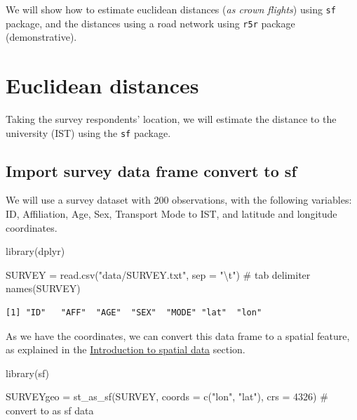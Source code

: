 \documentclass[
  letterpaper,
  DIV=11,
  numbers=noendperiod]{scrreprt}
\newenvironment{Shaded}{\begin{snugshade}}{\end{snugshade}}
\newcommand{\AttributeTok}[1]{\textcolor[rgb]{0.40,0.45,0.13}{#1}}
\newcommand{\CommentTok}[1]{\textcolor[rgb]{0.37,0.37,0.37}{#1}}
\newcommand{\DecValTok}[1]{\textcolor[rgb]{0.68,0.00,0.00}{#1}}
\newcommand{\FunctionTok}[1]{\textcolor[rgb]{0.28,0.35,0.67}{#1}}
\newcommand{\NormalTok}[1]{\textcolor[rgb]{0.00,0.23,0.31}{#1}}
\newcommand{\OtherTok}[1]{\textcolor[rgb]{0.00,0.23,0.31}{#1}}
\newcommand{\SpecialCharTok}[1]{\textcolor[rgb]{0.37,0.37,0.37}{#1}}
\newcommand{\StringTok}[1]{\textcolor[rgb]{0.13,0.47,0.30}{#1}}
\begin{document}
We will show how to estimate euclidean distances (\emph{as crown
flights}) using \texttt{sf} package, and the distances using a road
network using \texttt{r5r} package (demonstrative).

\section{Euclidean distances}\label{euclidean-distances}

Taking the survey respondents' location, we will estimate the distance
to the university (IST) using the \texttt{sf} package.

\subsection{Import survey data frame convert to
sf}\label{import-survey-data-frame-convert-to-sf}

We will use a survey dataset with 200 observations, with the following
variables: ID, Affiliation, Age, Sex, Transport Mode to IST, and
latitude and longitude coordinates.

\begin{Shaded}
\begin{Highlighting}[]
\FunctionTok{library}\NormalTok{(dplyr)}

\NormalTok{SURVEY }\OtherTok{=} \FunctionTok{read.csv}\NormalTok{(}\StringTok{"data/SURVEY.txt"}\NormalTok{, }\AttributeTok{sep =} \StringTok{"}\SpecialCharTok{\textbackslash{}t}\StringTok{"}\NormalTok{) }\CommentTok{\# tab delimiter}
\FunctionTok{names}\NormalTok{(SURVEY)}
\end{Highlighting}
\end{Shaded}

\begin{verbatim}
[1] "ID"   "AFF"  "AGE"  "SEX"  "MODE" "lat"  "lon" 
\end{verbatim}

As we have the coordinates, we can convert this data frame to a spatial
feature, as explained in the
\hyperref[create-spatial-data-from-coordinates]{Introduction to spatial
data} section.

\begin{Shaded}
\begin{Highlighting}[]
\FunctionTok{library}\NormalTok{(sf)}

\NormalTok{SURVEYgeo }\OtherTok{=} \FunctionTok{st\_as\_sf}\NormalTok{(SURVEY, }\AttributeTok{coords =} \FunctionTok{c}\NormalTok{(}\StringTok{"lon"}\NormalTok{, }\StringTok{"lat"}\NormalTok{), }\AttributeTok{crs =} \DecValTok{4326}\NormalTok{) }\CommentTok{\# convert to as sf data}
\end{Highlighting}
\end{Shaded}
\end{document}
